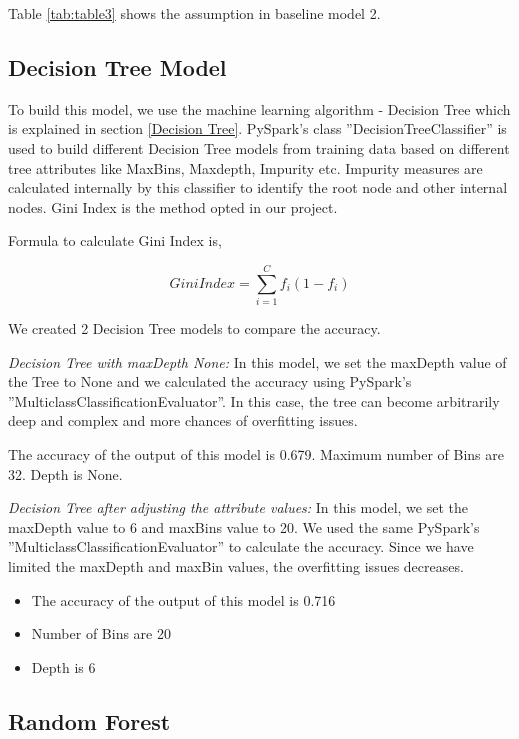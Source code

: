 \documentclass[sigconf]{acmart}
\begin{document}
Table \ref{tab:table3} shows the assumption in baseline model 2.

\subsection{Decision Tree Model}

To build this model, we use the machine learning algorithm - Decision Tree which is explained in section \ref{Decision Tree}. PySpark's class ''DecisionTreeClassifier'' is used to build different Decision Tree models from training data based on different tree attributes like MaxBins, Maxdepth, Impurity etc. Impurity measures are calculated internally by this classifier to identify the root node and other internal nodes. Gini Index is the method opted in our project.

Formula to calculate Gini Index is,

\begin{equation}
Gini Index = \sum_{i=1}^Cf_i(1-{f_i})
\end{equation}

We created 2 Decision Tree models to compare the accuracy.

\textit{Decision Tree with maxDepth None:} In this model, we set the maxDepth value of the Tree to None and we calculated the accuracy using PySpark's ''MulticlassClassificationEvaluator''. In this case, the tree can become arbitrarily deep and complex and more chances of overfitting issues.

The accuracy of the output of this model is 0.679. Maximum number of Bins are 32. Depth is None.

\textit{Decision Tree after adjusting the attribute values:} In this model, we set the maxDepth value to 6 and maxBins value to 20. We used the same PySpark's ''MulticlassClassificationEvaluator'' to calculate the accuracy. Since we have limited the maxDepth and maxBin values, the overfitting issues decreases.

\begin{itemize}
   \item The accuracy of the output of this model is 0.716
   \item Number of Bins are 20
   \item Depth is 6
\end{itemize}

\subsection{Random Forest}
\end{document}
